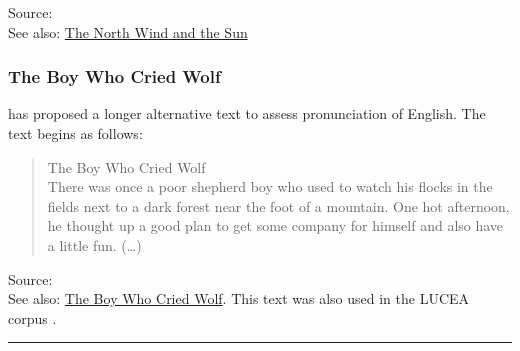 \documentclass[
]{book}
\begin{document}
Source: \citet{HandbookIPA_1999}\\
See also: \href{https://en.wikipedia.org/wiki/The_North_Wind_and_the_Sun}{The North Wind and the Sun}

\subsubsection{The Boy Who Cried Wolf}\label{the-boy-who-cried-wolf}

\citet{Deterding_2006} has proposed a longer alternative text to assess pronunciation of English. The text begins as follows:

\begin{quote}
The Boy Who Cried Wolf\\
There was once a poor shepherd boy who used to watch his flocks in the fields next to a dark forest near the foot of a mountain. One hot afternoon, he thought up a good plan to get some company for himself and also have a little fun. (\ldots)
\end{quote}

Source: \citet{Deterding_2006}\\
See also: \href{https://en.wikipedia.org/wiki/The_Boy_Who_Cried_Wolf}{The Boy Who Cried Wolf}. This text was also used in the LUCEA corpus \citep{Orr_Quené_2017}.

\begin{center}\rule{0.5\linewidth}{0.5pt}\end{center}

  
\end{document}
